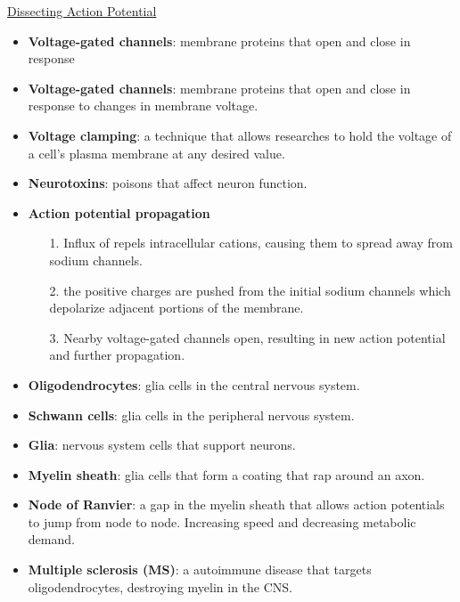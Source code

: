 \documentclass[12pt,letterpaper]{article}
\begin{document}
\hypertarget{43.2}{}
\begin{secbox}{\hyperlink{43}{Dissecting Action Potential}}{
    \begin{itemize}
        \item \textbf{Voltage-gated channels}: membrane proteins that open and close in response
        \item \textbf{Voltage-gated channels}: membrane proteins that open and close in response to changes in membrane voltage.
        \item \textbf{Voltage clamping}: a technique that allows researches to hold the voltage of a cell's plasma membrane at any desired value.
        \item \textbf{Neurotoxins}: poisons that affect neuron function.
        \item \textbf{Action potential propagation}
        \begin{itemize}
            \item [1.] Influx of  repels intracellular cations, causing them to spread away from sodium channels. 
            \item [2.] the positive charges are pushed from the initial sodium channels which depolarize adjacent portions of the membrane. 
            \item [3.] Nearby voltage-gated  channels open, resulting in new action potential and further propagation. 
        \end{itemize}
        \item \textbf{Oligodendrocytes}: glia cells in the central nervous system.
        \item \textbf{Schwann cells}: glia cells in the peripheral nervous system.
        \item \textbf{Glia}: nervous system cells that support neurons. 
        \item \textbf{Myelin sheath}: glia cells that form a coating that rap around an axon.
        \item \textbf{Node of Ranvier}: a gap in the myelin sheath that allows action potentials to jump from node to node. Increasing speed and decreasing metabolic demand. 
        \item \textbf{Multiple sclerosis (MS)}: a autoimmune disease that targets oligodendrocytes, destroying myelin in the CNS.
    \end{itemize}
}\end{secbox}
\end{document}
